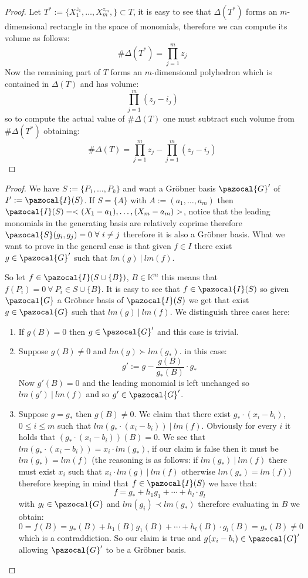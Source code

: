 \documentclass[11pt,a4paper]{report}
\theoremstyle{plain}
\theoremstyle{definition}
\newcommand{\I}{\pazocal{I}}
\newcommand{\G}{\pazocal{G}}
\newcommand{\Sp}{\pazocal{S}}
\begin{document}
\begin{lem-hand}[3.1.9]
\end{lem-hand}
\begin{proof}
	Let $T^* := \{X_1^{z_1}, \ldots, X_m^{z_m},\} \subset T$, it is easy to see that $\Delta(T^*)$ forms an $m$-dimensional rectangle in the space of monomials, therefore we can compute its volume as follows:
	\[
		\#\Delta(T^*) = \prod\limits_{j = 1}^m z_j
	\]
	Now the remaining part of $T$ forms an $m$-dimensional polyhedron which is contained in $\Delta(T)$ and has volume:
	\[
		\prod\limits_{j = 1}^m (z_j - i_j)
	\]	
	 so to compute the actual value of $\#\Delta(T)$ one must subtract such volume from $\#\Delta(T^*)$ obtaining:
	 \[
		\#\Delta(T) = 	\prod\limits_{j = 1}^m z_j - \prod\limits_{j = 1}^m (z_j - i_j)
	 \]
\end{proof}

\begin{thm-hand}[3.2.1]
\end{thm-hand}
\begin{proof}
	We have $S := \{P_1, \ldots, P_k\}$ and want a Gr\"obner basis $\G'$ of $I' := \I(S)$. 
	If $S = \{A\}$ with $A := (a_1,\ldots ,a_m)$ then $\I(S) = <(X_1 - a_1), \ldots, (X_m -a_m)>$, notice that the leading monomials in the generating basis are relatively coprime therefore $\Sp(g_i,g_j) = 0\ \forall\ i\ne j$ therefore it is also a Gr\"obner basis.
	What we want to prove in the general case is that given $f \in I$ there exist $g \in \G'$ such that $lm(g)\ |\ lm(f)$.
	
	So let $f \in \I(S \cup \{B\})$, $B \in \mathbb{K}^m$ this means that $f(P_i) = 0\ \forall\ P_i \in S\cup \{B\}$. It is easy to see that $f \in \I(S)$ so given $\G$ a Gr\"obner basis of $\I(S)$ we get that exist $g \in \G$ such that $lm(g)\ |\ lm(f)$. We distinguish three cases here:
	\begin{enumerate}
		\item If $g(B) = 0$ then $g \in \G'$ and this case is trivial.
		\item Suppose $g(B) \ne 0$ and $lm(g)\succ lm(g_*)$. in this case:
			\[
				g' := g - \frac{g(B)}{g_*(B)}\cdot g_*			
			\]
			Now $g'(B) = 0$ and the leading monomial is left unchanged so $lm(g')\ |\ lm(f)$ and so $g' \in \G'$.
		\item Suppose $g = g_*$ then $g(B) \ne 0$. We claim that there exist $g_*\cdot (x_i - b_i)$, $0\le i \le m$ such that $lm(g_*\cdot (x_i - b_i))\ |\ lm(f)$. Obviously for every $i$ it holds that $(g_*\cdot (x_i - b_i))(B) = 0$. We see that $lm(g_*\cdot (x_i - b_i)) = x_i\cdot lm(g_*)$, if our claim is false then it must be $lm(g_*) = lm(f)$ (the reasoning is as follows: if $lm(g_*)\ |\ lm(f)$ there must exist $x_i$ such that $x_i\cdot lm(g)\ |\ lm(f)$ otherwise $lm(g_*)= lm(f)$) therefore keeping in mind that $f \in \I(S)$ we have that:
		\[
			f = g_* + h_1g_1 + \cdots + 	h_l\cdot g_l
		\]
		with $g_l \in \G$ and $lm(g_i) \prec lm(g_*)$ therefore evaluating in $B$ we obtain:
		\[
			0 = f(B) = g_*(B) + h_1(B)g_1(B) + \cdots + 	h_l(B)\cdot g_l(B) = g_*(B) \ne 0
		\]
		which is a contraddiction. So our claim is true and $g(x_i - b_i) \in \G'$ allowing $\G'$ to be a Gr\"obner basis.
	\end{enumerate}
\end{proof}
\end{document}
